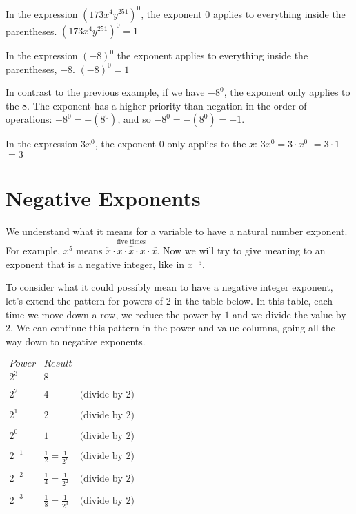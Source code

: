 \documentclass{ximera}
\begin{document}
     In the expression $\left(173 x^4 y^{251}\right)^0$,
                    the exponent $0$ applies to everything inside the parentheses.
$
                      \left(173 x^4 y^{251}\right)^0 =  1
                    $

       In the expression $(-8)^0$ the exponent applies to everything inside the parentheses,
                    $-8$.
                    $
                      (-8)^0  =  1
                    $

       In contrast to the previous example, if we have $-8^0$, 
                    the exponent only applies to the $8$.
                    The exponent has a higher priority than negation in the order of operations: $-8^0 = -\left(8^0\right)$, and so $-8^0  =  -\left(8^0\right)=  -1$.

      In the expression $3x^0$,
                    the exponent $0$ only applies to the $x$:
                      $3x^0 = 3\cdot x^0$
                      $= 3\cdot 1$
                      $= 3$
\section{Negative Exponents}
   We understand what it means for a variable to have a natural number exponent.
      For example, $x^5$ means $\overbrace{x\cdot x\cdot x\cdot x\cdot x}^{\text{five times}}$.
      Now we will try to give meaning to an exponent that is a negative integer,
      like in $x^{-5}$.

        To consider what it could possibly mean to have a negative integer exponent,
        let's extend the pattern for powers of 2 in the table below.
        In this table, each time we move down a row,
        we reduce the power by $1$ and we divide the value by $2$.
        We can continue this pattern in the power and value columns,
        going all the way down to negative exponents.
%
\begin{center}
$
  \begin{array}{ccc}
            Power & Result & \\
        \hline
            2^3 & 8 & \\
\\
              2^2 & 4 & \text{(divide by 2)} \\
\\
               2^1 & 2 & \text{(divide by 2)} \\
\\
                     2^0 & 1 & \text{(divide by 2)} \\
\\
           2^{-1} & \frac{1}{2}=\frac{1}{2^1} & \text{(divide by 2)} \\   
\\       
           2^{-2} & \frac{1}{4}=\frac{1}{2^2} & \text{(divide by 2)} \\
\\
                   2^{-3} & \frac{1}{8}=\frac{1}{2^3} & \text{(divide by 2)} \\          
     \end{array}
$
\end{center}
\end{document}

